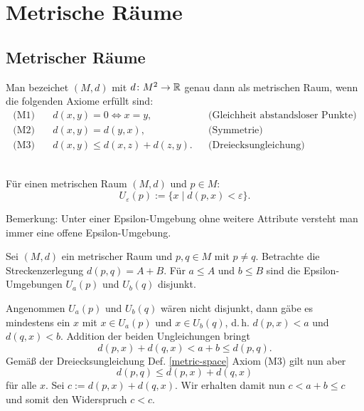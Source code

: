 \section{Metrische Räume}
\subsection{Metrischer Räume}
\begin{Definition}%
\label{metric-space}
Man bezeichet $(M,d)$ mit $d\colon M^2\to\mathbb R$ genau dann als
metrischen Raum, wenn die folgenden Axiome erfüllt sind:
\begin{align*}
\text{(M1)}\quad & d(x,y)=0\iff x=y, &&\text{(Gleichheit abstandsloser Punkte)}\\
\text{(M2)}\quad & d(x,y)=d(y,x), &&\text{(Symmetrie)}\\
\text{(M3)}\quad & d(x,y)\le d(x,z)+d(z,y). &&\text{(Dreiecksungleichung)}
\end{align*}
\end{Definition}

\begin{Definition}\mbox{}\\
Für einen metrischen Raum $(M,d)$ und $p\in M$:
\[U_\varepsilon(p) := \{x\mid d(p,x)<\varepsilon\}.\]
\end{Definition}
Bemerkung: Unter einer Epsilon-Umgebung ohne weitere Attribute
versteht man immer eine offene Epsilon-Umgebung.

\begin{Satz}%
\label{construction-disjoint-ep-balls}
Sei $(M,d)$ ein metrischer Raum und $p,q\in M$ mit $p\ne q$.
Betrachte die Streckenzerlegung $d(p,q)=A+B$. Für $a\le A$ und
$b\le B$ sind die Epsilon-Umgebungen $U_a(p)$ und $U_b(q)$ disjunkt.
\end{Satz}

\begin{Beweis}
Angenommen $U_a(p)$ und $U_b(q)$ wären nicht disjunkt, dann gäbe
es mindestens ein $x$ mit $x\in U_a(p)$ und $x\in U_b(q)$, d.\,h.
$d(p,x)<a$ und $d(q,x)<b$. Addition der beiden Ungleichungen
bringt
\[d(p,x)+d(q,x)<a+b\le d(p,q).\]
Gemäß der Dreiecksungleichung Def. \ref{metric-space} Axiom (M3) gilt
nun aber
\[d(p,q)\le d(p,x)+d(q,x)\]
für alle $x$. Sei $c:=d(p,x)+d(q,x)$. Wir erhalten damit nun
$c<a+b\le c$ und somit den Widerspruch $c<c$.\,\qedsymbol
\end{Beweis}

